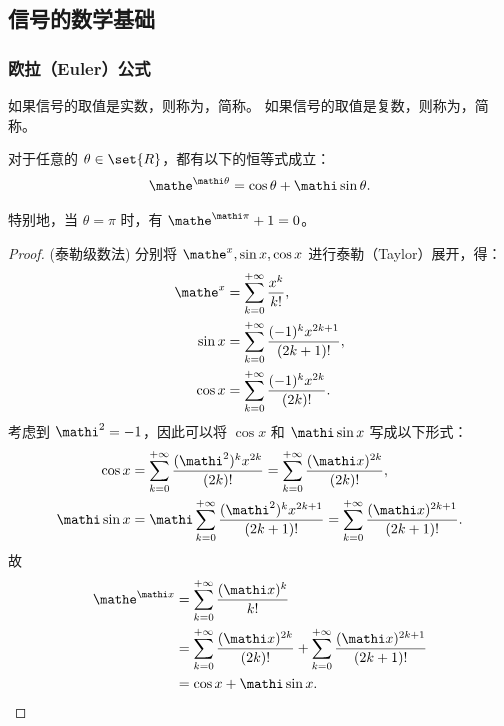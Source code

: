\subsection{信号的数学基础}

\subsubsection{欧拉（Euler）公式}

\begin{definition}[实值信号与复值信号]
    如果信号的取值是实数，则称为，简称。
    如果信号的取值是复数，则称为，简称。
\end{definition}

\begin{theorem}[欧拉公式]
    对于任意的 $\theta \in \set{R}$，都有以下的恒等式成立：
    \begin{align*}
        \mathe^{\mathi \theta} = \cos \theta + \mathi \sin\theta.
    \end{align*}

    特别地，当 $\theta = \pi$ 时，有 $\mathe^{\mathi\pi} + 1 = 0$。
\end{theorem}

\begin{proof}
    (泰勒级数法)
    分别将 $\mathe^x, \sin x, \cos x$ 进行泰勒（Taylor）展开，得：
    \begin{align*}
        \mathe^x &= \sum_{k = 0}^{+\infty}\frac{x^k}{k!}, \\
        \sin x   &= \sum_{k = 0}^{+\infty}\frac{(-1)^kx^{2k + 1}}{(2k + 1)!}, \\
        \cos x   &= \sum_{k = 0}^{+\infty}\frac{(-1)^kx^{2k}}{(2k)!}.
    \end{align*}
    考虑到 $\mathi^2 = -1$，因此可以将 $\cos x$ 和 $\mathi\sin x$ 写成以下形式：
    \begin{align*}
        \cos x &= \sum_{k = 0}^{+\infty}\frac{(\mathi^2)^kx^{2k}}{(2k)!}
                = \sum_{k = 0}^{+\infty}\frac{(\mathi x)^{2k}}{(2k)!}, \\
        \mathi\sin x &= \mathi\sum_{k = 0}^{+\infty}\frac{(\mathi^2)^kx^{2k + 1}}{(2k + 1)!}
                = \sum_{k = 0}^{+\infty}\frac{(\mathi x)^{2k + 1}}{(2k + 1)!}.
    \end{align*}
    故
    \begin{align*}
        \mathe^{\mathi x} & = \sum_{k = 0}^{+\infty}\frac{(\mathi x)^k}{k!} \\
        & = \sum_{k = 0}^{+\infty}\frac{(\mathi x)^{2k}}{(2k)!} + 
            \sum_{k = 0}^{+\infty}\frac{(\mathi x)^{2k + 1}}{(2k + 1)!} \\
        & = \cos x + \mathi \sin x.
    \end{align*}
\end{proof}

